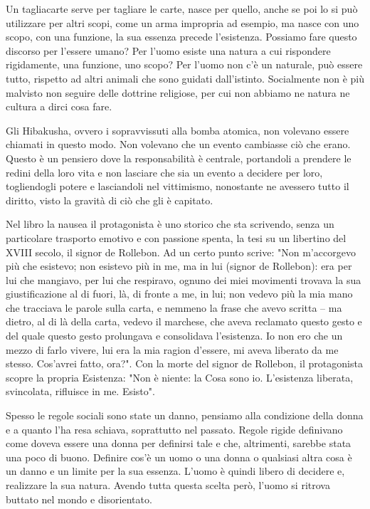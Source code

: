 \documentclass[12pt]{book} %
\begin{document}
Un tagliacarte serve per tagliare le carte, nasce per quello, anche se poi lo si può utilizzare per altri scopi, come un
arma impropria ad esempio, ma nasce con uno scopo, con una funzione, la sua essenza precede l'esistenza. Possiamo fare
questo discorso per l'essere umano? Per l'uomo esiste una natura a cui rispondere rigidamente, una funzione, uno scopo?
Per l'uomo non c'è un naturale, può essere tutto, rispetto ad altri animali che sono
guidati dall'istinto. Socialmente non è più malvisto non seguire delle dottrine religiose, per cui non abbiamo ne
natura ne cultura a dirci cosa fare. 

Gli Hibakusha, ovvero i sopravvissuti alla bomba atomica, non volevano essere chiamati in questo modo. Non volevano che
un evento cambiasse ciò che erano. Questo è un pensiero dove la responsabilità è centrale, portandoli a prendere le
redini della loro vita e non lasciare che sia un evento a decidere per loro, togliendogli potere e lasciandoli nel
vittimismo, nonostante ne avessero tutto il diritto, visto la gravità di ciò che gli è capitato. 

Nel libro la nausea il protagonista è uno storico che sta scrivendo,
senza un particolare trasporto emotivo e con passione spenta, la tesi su un libertino del XVIII secolo, il signor de
Rollebon. Ad un certo punto scrive: "Non m'accorgevo più che esistevo; non
esistevo più in me, ma in lui (signor de Rollebon): era per lui che mangiavo, per lui che respiravo, ognuno dei miei
movimenti trovava la sua giustificazione al di fuori, là, di fronte a me, in lui; non vedevo più la mia mano che
tracciava le parole sulla carta, e nemmeno la frase che avevo scritta – ma dietro, al di là della carta, vedevo il
marchese, che aveva reclamato questo gesto e del quale questo gesto prolungava e consolidava
l'esistenza. Io non ero che un mezzo di farlo vivere, lui era la mia ragion
d'essere, mi aveva liberato da me stesso. Cos'avrei fatto,
ora?". Con la morte del signor de Rollebon, il protagonista scopre la propria Esistenza:
"Non è niente: la Cosa sono io. L'esistenza liberata, svincolata, rifluisce
in me. Esisto". 

Spesso le regole sociali sono state un danno, pensiamo alla condizione della donna e a quanto l'ha resa schiava,
soprattutto nel passato. Regole rigide definivano come doveva essere una donna per definirsi tale e che, altrimenti,
sarebbe stata una poco di buono. Definire cos'è un uomo o una donna o qualsiasi altra cosa è un danno e un limite per
la sua essenza. L'uomo è quindi libero di decidere e, realizzare la sua natura. Avendo tutta questa scelta però, l'uomo
si ritrova buttato nel mondo e disorientato.
\end{document}
